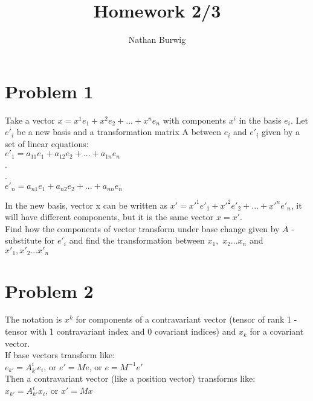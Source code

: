 \documentclass[11pt, letterpaper]{article}
\title{Homework 2/3}
\author{Nathan Burwig}
\begin{document}
    \maketitle

    \section*{Problem 1}
    Take a vector $x=x^1e_1+x^2e_2+...+x^ne_n$ with components $x^i$ in the
    basis ${e_i}$. Let ${e'_i}$ be a new basis and a transformation matrix A
    between ${e_i}$ and ${e'_i}$ given by a set of linear equations: \\
    
 
    \setlength{\leftskip}{3cm}
     $e'_1 = a_{11}e_1+a_{12}e_2+...+a_{1n}e_n$ \\
      .\\
      .\\
     $e'_n = a_{n1}e_1+a_{n2}e_2+...+a_{nn}e_n$ \\
     

    \setlength{\leftskip}{0cm}


     In the new basis, vector x can be written as
     $x'=x'^1e'_1+x'^2e'_2+...+x'^ne'_n$, it will have different components,
     but it is the same vector $x=x'$.\\

     Find how the components of vector transform under base change given by $A$
     - substitute for {$e'_i$} and find the transformation between $x_1,$
     $x_2...x_n$ and $x'_1,x'_2...x'_n$

     
     \section*{Problem 2}
     The notation is $x^k$ for components of a contravariant vector (tensor of
     rank 1 - tensor with 1 contravariant index and 0 covariant indices) and
     $x_k$ for a covariant vector.\\

     If base vectors transform like:\\

     \qquad$e_{k'}=A_{k'}^{i} e_i$, or $e'=Me$, or $e=M^{-1}e'$\\

     Then a contravariant vector (like a position vector) transforms like:\\

     \qquad$x_{k'}=A^i_{k'}x_i$, or $x' = Mx$\\
\end{document}
